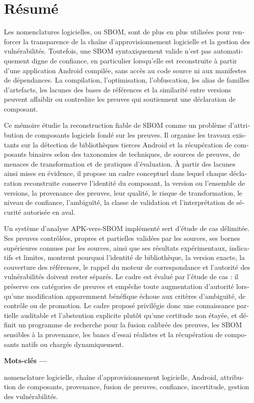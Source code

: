 \chapter*{Résumé}

\begin{otherlanguage}{french}
Les nomenclatures logicielles, ou SBOM, sont de plus en plus utilisées pour
renforcer la transparence de la chaîne d'approvisionnement logicielle et la
gestion des vulnérabilités. Toutefois, une SBOM syntaxiquement valide n'est
pas automatiquement digne de confiance, en particulier lorsqu'elle est
reconstruite à partir d'une application Android compilée, sans accès au code
source ni aux manifestes de dépendances. La compilation, l'optimisation,
l'obfuscation, les alias de familles d'artefacts, les lacunes des bases de
références et la similarité entre versions peuvent affaiblir ou contredire les
preuves qui soutiennent une déclaration de composant.

Ce mémoire étudie la reconstruction fiable de SBOM comme un problème
d'attribution de composants logiciels fondé sur les preuves. Il organise les
travaux existants sur la détection de bibliothèques tierces Android et la
récupération de composants binaires selon des taxonomies de techniques, de
sources de preuves, de menaces de transformation et de pratiques
d'évaluation. À partir des lacunes ainsi mises en évidence, il propose un
cadre conceptuel dans lequel chaque déclaration reconstruite conserve
l'identité du composant, la version ou l'ensemble de versions, la provenance
des preuves, leur qualité, le risque de transformation, le niveau de
confiance, l'ambiguïté, la classe de validation et l'interprétation de
sécurité autorisée en aval.

Un système d'analyse APK-vers-SBOM implémenté sert d'étude de cas délimitée. Ses
preuves contrôlées, propres et partielles validées par les sources, ses bornes
supérieures connues par les sources, ainsi que ses résultats expérimentaux,
indicatifs et limites, montrent pourquoi l'identité de bibliothèque, la
version exacte, la couverture des références, le rappel du moteur de
correspondance et l'autorité des vulnérabilités doivent rester séparés. Le
cadre est évalué par l'étude de cas : il préserve ces catégories de preuves et
empêche toute augmentation d'autorité lorsqu'une modification apparemment
bénéfique échoue aux critères d'ambiguïté, de contrôle ou de promotion. Le
cadre proposé privilégie donc une connaissance partielle auditable et
l'abstention explicite plutôt qu'une certitude non étayée, et définit un
programme de recherche pour la fusion calibrée des preuves, les SBOM sensibles
à la provenance, les bancs d'essai réalistes et la récupération de composants
natifs ou chargés dynamiquement.
\end{otherlanguage}

\vspace{0.5cm}
\noindent\textbf{Mots-clés ---}
\begin{otherlanguage}{french}
nomenclature logicielle, chaîne d'approvisionnement logicielle, Android,
attribution de composants, provenance, fusion de preuves, confiance,
incertitude, gestion des vulnérabilités.
\end{otherlanguage}
